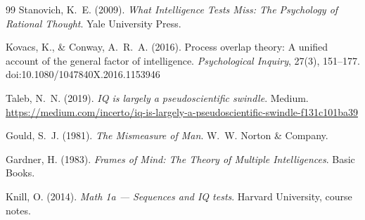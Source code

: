 \documentclass[10pt, a4paper]{article}
\theoremstyle{plain}
\theoremstyle{definition}
\theoremstyle{remark}
\begin{document}
\begin{thebibliography}{99}
Stanovich, K.~E. (2009).
\textit{What Intelligence Tests Miss: The Psychology of Rational Thought}.
Yale University Press.

Kovacs, K., \& Conway, A.~R.~A. (2016).
Process overlap theory: A unified account of the general factor of intelligence.
\textit{Psychological Inquiry}, 27(3), 151--177.
doi:10.1080/1047840X.2016.1153946

Taleb, N.~N. (2019).
\textit{IQ is largely a pseudoscientific swindle}.
Medium. \url{https://medium.com/incerto/iq-is-largely-a-pseudoscientific-swindle-f131c101ba39}

Gould, S.~J. (1981).
\textit{The Mismeasure of Man}.
W.~W. Norton \& Company.

Gardner, H. (1983).
\textit{Frames of Mind: The Theory of Multiple Intelligences}.
Basic Books.

Knill, O. (2014).
\textit{Math 1a — Sequences and IQ tests}.
Harvard University, course notes.

\end{thebibliography}
\end{document}
